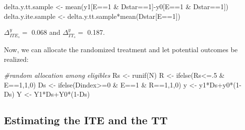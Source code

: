 \documentclass[
]{book}
\newenvironment{Shaded}{\begin{snugshade}}{\end{snugshade}}
\newcommand{\CommentTok}[1]{\textcolor[rgb]{0.56,0.35,0.01}{\textit{#1}}}
\newcommand{\DecValTok}[1]{\textcolor[rgb]{0.00,0.00,0.81}{#1}}
\newcommand{\FunctionTok}[1]{\textcolor[rgb]{0.00,0.00,0.00}{#1}}
\newcommand{\NormalTok}[1]{#1}
\newcommand{\OtherTok}[1]{\textcolor[rgb]{0.56,0.35,0.01}{#1}}
\newcommand{\SpecialCharTok}[1]{\textcolor[rgb]{0.00,0.00,0.00}{#1}}
\theoremstyle{definition}
\theoremstyle{definition}
\theoremstyle{definition}
\theoremstyle{definition}
\theoremstyle{remark}
\begin{document}
\begin{Shaded}
\begin{Highlighting}[]
\NormalTok{delta.y.tt.sample }\OtherTok{\textless{}{-}} \FunctionTok{mean}\NormalTok{(y1[E}\SpecialCharTok{==}\DecValTok{1} \SpecialCharTok{\&}\NormalTok{ Dstar}\SpecialCharTok{==}\DecValTok{1}\NormalTok{]}\SpecialCharTok{{-}}\NormalTok{y0[E}\SpecialCharTok{==}\DecValTok{1} \SpecialCharTok{\&}\NormalTok{ Dstar}\SpecialCharTok{==}\DecValTok{1}\NormalTok{])}
\NormalTok{delta.y.ite.sample }\OtherTok{\textless{}{-}}\NormalTok{ delta.y.tt.sample}\SpecialCharTok{*}\FunctionTok{mean}\NormalTok{(Dstar[E}\SpecialCharTok{==}\DecValTok{1}\NormalTok{])}
\end{Highlighting}
\end{Shaded}

\(\Delta^y_{ITE_s}=\) 0.068 and \(\Delta^y_{TT_s}=\) 0.187.

Now, we can allocate the randomized treatment and let potential outcomes be realized:

\begin{Shaded}
\begin{Highlighting}[]
\CommentTok{\#random allocation among eligibles}
\NormalTok{Rs }\OtherTok{\textless{}{-}} \FunctionTok{runif}\NormalTok{(N)}
\NormalTok{R }\OtherTok{\textless{}{-}} \FunctionTok{ifelse}\NormalTok{(Rs}\SpecialCharTok{\textless{}=}\NormalTok{.}\DecValTok{5} \SpecialCharTok{\&}\NormalTok{ E}\SpecialCharTok{==}\DecValTok{1}\NormalTok{,}\DecValTok{1}\NormalTok{,}\DecValTok{0}\NormalTok{)}
\NormalTok{Ds }\OtherTok{\textless{}{-}} \FunctionTok{ifelse}\NormalTok{(Dindex}\SpecialCharTok{\textgreater{}=}\DecValTok{0} \SpecialCharTok{\&}\NormalTok{ E}\SpecialCharTok{==}\DecValTok{1} \SpecialCharTok{\&}\NormalTok{ R}\SpecialCharTok{==}\DecValTok{1}\NormalTok{,}\DecValTok{1}\NormalTok{,}\DecValTok{0}\NormalTok{)}
\NormalTok{y }\OtherTok{\textless{}{-}}\NormalTok{ y1}\SpecialCharTok{*}\NormalTok{Ds}\SpecialCharTok{+}\NormalTok{y0}\SpecialCharTok{*}\NormalTok{(}\DecValTok{1}\SpecialCharTok{{-}}\NormalTok{Ds)}
\NormalTok{Y }\OtherTok{\textless{}{-}}\NormalTok{ Y1}\SpecialCharTok{*}\NormalTok{Ds}\SpecialCharTok{+}\NormalTok{Y0}\SpecialCharTok{*}\NormalTok{(}\DecValTok{1}\SpecialCharTok{{-}}\NormalTok{Ds)}
\end{Highlighting}
\end{Shaded}

\hypertarget{estimating-the-ite-and-the-tt}{%
\subsection{Estimating the ITE and the TT}\label{estimating-the-ite-and-the-tt}}
\end{document}
